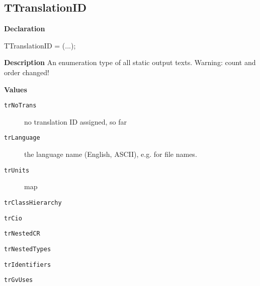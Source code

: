 \documentclass{report}
\newif\ifpdf
\begin{document}
\subsection*{TTranslationID}
\fi
\label{PasDoc_Languages-TTranslationID}
\begin{list}{}{
\setlength{\itemindent}{0cm}
\setlength{\listparindent}{0cm}
\setlength{\leftmargin}{\evensidemargin}
\addtolength{\leftmargin}{\tmplength}
\settowidth{\labelsep}{X}
\addtolength{\leftmargin}{\labelsep}
\setlength{\labelwidth}{\tmplength}
}
\item[\textbf{Declaration}\hfill]
\ifpdf
\begin{flushleft}
\fi
\begin{ttfamily}
TTranslationID = (...);\end{ttfamily}

\ifpdf
\end{flushleft}
\fi

\par
\item[\textbf{Description}]
An enumeration type of all static output texts. Warning: count and order changed!\item[\textbf{Values}]
\begin{description}
\item[\texttt{trNoTrans}] \label{PasDoc_Languages-trNoTrans}
\index{}
no translation ID assigned, so far
\item[\texttt{trLanguage}] \label{PasDoc_Languages-trLanguage}
\index{}
the language name (English, ASCII), e.g. for file names.
\item[\texttt{trUnits}] \label{PasDoc_Languages-trUnits}
\index{}
map
\item[\texttt{trClassHierarchy}] \label{PasDoc_Languages-trClassHierarchy}
\index{}
 
\item[\texttt{trCio}] \label{PasDoc_Languages-trCio}
\index{}
 
\item[\texttt{trNestedCR}] \label{PasDoc_Languages-trNestedCR}
\index{}
 
\item[\texttt{trNestedTypes}] \label{PasDoc_Languages-trNestedTypes}
\index{}
 
\item[\texttt{trIdentifiers}] \label{PasDoc_Languages-trIdentifiers}
\index{}
 
\item[\texttt{trGvUses}] \label{PasDoc_Languages-trGvUses}
\index{}
 

\end{description}
\end{list}
\end{document}
